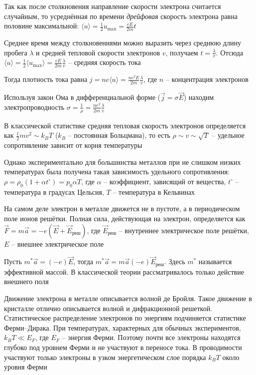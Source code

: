 \documentclass[12pt]{article}
\begin{document}
Так как после столкновения направление скорости электрона считается случайным, то усреднённая по времени \emph{дрейфовая} скорость электрона равна половине максимальной: $\langle u \rangle = \frac{1}{2} u_{\max} = \frac{eE}{2m} t$

Среднее время между столкновениями можно выразить через среднюю длину пробега $\lambda$ и средней тепловой скорости электронов $v$, получаем $t = \frac{\lambda}{v}$. Отсюда $\langle u \rangle = \frac{1}{2} \langle u_{\max}\rangle = \frac{eE}{2m} \frac{\lambda}{v}$ -- средняя скорость тока

Тогда плотность тока равна $j = n e \langle u \rangle = \frac{n e^2 E}{2m} \frac{\lambda}{v}$, где $n$ -- концентрация электронов

Используя закон Ома в дифференциальной форме ($\vec j = \sigma \vec E$) находим электропроводность $\sigma = \frac{1}{\rho} = \frac{n e^2}{2m} \frac{\lambda}{v}$

В классической статистике средняя тепловая скорость электронов определяется как $\frac{1}{2} m v^2 \sim k_B T$ ($k_B$ -- постоянная Больцмана), то есть $\rho \sim v \sim \sqrt{T}$ -- удельное сопротивление зависит от корня температуры

Однако экспериментально для большинства металлов при не слишком низких температурах была получена такая зависимость удельного сопротивления: $\rho = \rho_0 (1 + \alpha t^\circ) = p_0 \alpha T$, где $\alpha$ -- коэффициент, зависящий от вещества, $t^\circ$ -- температура в градусах Цельсия, $T$ -- температура в Кельвинах

На самом деле электрон в металле движется не в пустоте, а в периодическом поле ионов решётки. Полная сила, действующая на электрон, определяется как $\vec F = m \vec a = -e(\vec E + \vec E_{\text{реш}})$, где $\vec E_{\text{реш}}$ -- внутреннее электрическое поле решётки, $E$ -- внешнее электрическое поле

Пусть $m^* \vec a = (-e) \vec E$, тогда $m^* \vec a = m\vec a (-e) \vec E_\text{реш}$. Здесь $m^*$ называется эффективной массой. В классической теории рассматривалось только действие внешнего поля

Движение электрона в металле описывается волной де Бройля. Такое движение в кристалле отлично описывается волной и дифракционной решеткой. Статистическое распределение электронов по энергиям подчиняется статистике Ферми–Дирака. При температурах, характерных для обычных экспериментов, $k_B T \ll E_F$, где $E_F$ -- энергия Ферми. Поэтому почти все электроны находятся глубоко под уровнем Ферми и не участвуют в переносе тока. В проводимости участвуют только электроны в узком энергетическом слое порядка $k_B T$ около уровня Ферми
\end{document}
